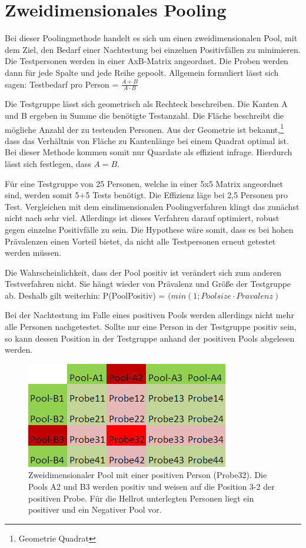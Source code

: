 \cleardoublepage

\section{Zweidimensionales Pooling}
Bei dieser Poolingmethode handelt es sich um einen zweidimensionalen Pool, mit dem Ziel, den Bedarf einer Nachtestung bei einzelnen Positivfällen zu minimieren.
Die Testpersonen werden in einer AxB-Matrix angeordnet.
Die Proben werden dann für jede Spalte und jede Reihe gepoolt.
Allgemein formuliert lässt sich sagen:
Testbedarf pro Person =
$\frac{A+B}{A\cdot B}$

Die Testgruppe lässt sich geometrisch als Rechteck beschreiben.
Die Kanten A und B ergeben in Summe die benötigte Testanzahl.
Die Fläche beschreibt die mögliche Anzahl der zu testenden Personen.
Aus der Geometrie ist bekannt,\footnote{Geometrie Quadrat}
dass das Verhältnis von Fläche zu Kantenlänge bei einem Quadrat optimal ist.
Bei dieser Methode kommen somit nur Quardate als effizient infrage.
Hierdurch lässt sich festlegen, dass $A=B$.

Für eine Testgruppe von 25 Personen, welche in einer 5x5 Matrix angeordnet sind, werden somit 5+5 Tests benötigt.
Die Effizienz läge bei 2,5 Personen pro Test.
Vergleichen mit dem eindimensionalen Poolingverfahren klingt das zunächst nicht nach sehr viel.
Allerdings ist dieses Verfahren darauf optimiert, robust gegen einzelne Positivfälle zu sein.
Die Hypothese wäre somit, dass es bei hohen Prävalenzen einen Vorteil bietet, da nicht alle Testpersonen erneut getestet werden müssen.

Die Wahrscheinlichkeit, dass der Pool positiv ist verändert sich zum anderen Testverfahren nicht.
Sie hängt wieder von Prävalenz und Größe der Testgruppe ab.
Deshalb gilt weiterhin:
P(PoolPositiv) = $(min\left(1;Poolsize\cdot Pravalenz\right)$

Bei der Nachtestung im Falle eines positiven Pools werden allerdings nicht mehr alle Personen nachgetestet.
Sollte nur eine Person in der Testgruppe positiv sein, so kann dessen Position in der Testgruppe anhand der positiven Pools abgelesen werden.
\begin{figure}[h]
	\centering
	\includegraphics[height=.25\textwidth]{img/2d_Pool_1Positiv}
	\caption{Zweidimensionaler Pool mit einer positiven Person (Probe32). Die Pools A2 und B3 werden positiv und weisen auf die Position 3-2 der positiven Probe. Für die Hellrot unterlegten Personen liegt ein positiver und ein Negativer Pool vor.\footnotemark}
\end{figure}

